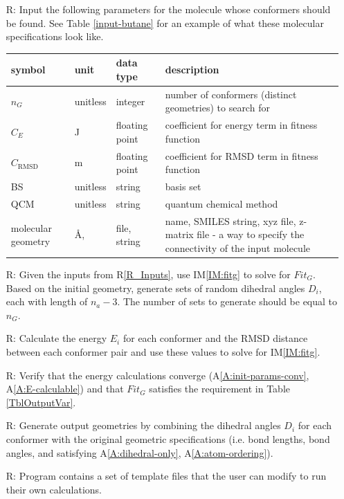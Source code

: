 \documentclass[12pt]{article}
\newcommand{\aref}[1]{A\ref{#1}}
\newcommand{\iref}[1]{IM\ref{#1}}
\newcounter{reqnum} %
\newcommand{\rref}[1]{R\ref{#1}}
\begin{document}
\noindent \begin{itemize}

\item[R\refstepcounter{reqnum}\thereqnum \label{R_Inputs}:] Input the following 
parameters for the molecule whose conformers should be found. See Table 
\ref{input-butane} for an example of what these molecular specifications look 
like.

\begin{tabularx}{\textwidth}{p{1.7cm}p{2cm}p{2cm}X}
	\toprule
	symbol & unit & data type & description \\
	\midrule
	$n_G$ & unitless & integer & number of conformers (distinct geometries) 
	to search for \\
	$C_E$ & \si{\joule} & floating point & coefficient for energy term in 
	fitness function \\
	$C_\text{RMSD}$ & \si{\metre} & floating point & coefficient for RMSD term 
	in fitness function \\
	BS & unitless & string & basis set \\
	QCM & unitless & string & quantum chemical method \\
	molecular geometry & \si{\angstrom}, \textdegree & file, string & name, 
	SMILES 
	string, xyz file, z-matrix file - a way to specify the connectivity of 
	the input molecule \\
	\bottomrule
\end{tabularx}

\item[R\refstepcounter{reqnum}\thereqnum \label{R_OutputInputs}:] Given the 
inputs from \rref{R_Inputs}, use \iref{IM:fitg} to solve for $Fit_G$. Based on 
the initial geometry, generate sets of random dihedral angles $D_i$, each with 
length of $n_a - 3$. The number of sets to generate should be equal to $n_G$.

\item[R\refstepcounter{reqnum}\thereqnum \label{R_Calculate}:] Calculate the 
energy $E_i$ for each conformer and the RMSD distance between each conformer 
pair and use these values to solve for \iref{IM:fitg}.

\item[R\refstepcounter{reqnum}\thereqnum \label{R_VerifyOutput}:] Verify that 
the energy calculations converge (\aref{A:init-params-conv}, 
\aref{A:E-calculable}) and that $Fit_G$ satisfies 
the requirement in 
Table \ref{TblOutputVar}.

\item[R\refstepcounter{reqnum}\thereqnum \label{R_Output}:] Generate output 
geometries by combining the dihedral angles $D_i$ for each conformer 
with the original geometric specifications (i.e. bond lengths, bond angles, and 
satisfying \aref{A:dihedral-only}, \aref{A:atom-ordering}).

\item[R\refstepcounter{reqnum}\thereqnum \label{R_template}:] Program contains 
a set of template files that the user can modify to run their own calculations.

\end{itemize}
\end{document}
